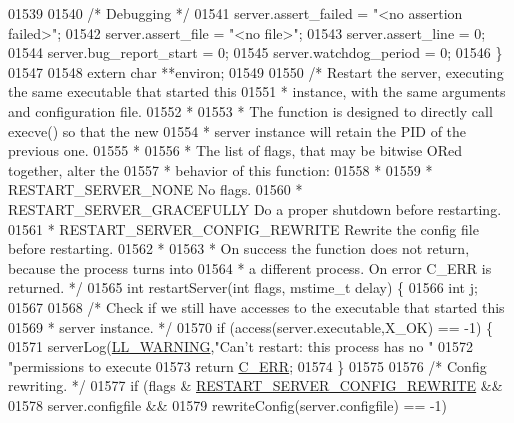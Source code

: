 \begin{DoxyCode}
{{{{{{{{{{{{{{{01539 
01540     \textcolor{comment}{/* Debugging */}
01541     server.assert\_failed = \textcolor{stringliteral}{"<no assertion failed>"};
01542     server.assert\_file = \textcolor{stringliteral}{"<no file>"};
01543     server.assert\_line = 0;
01544     server.bug\_report\_start = 0;
01545     server.watchdog\_period = 0;
01546 \}
01547 
01548 \textcolor{keyword}{extern} \textcolor{keywordtype}{char} **environ;
01549 
01550 \textcolor{comment}{/* Restart the server, executing the same executable that started this}
01551 \textcolor{comment}{ * instance, with the same arguments and configuration file.}
01552 \textcolor{comment}{ *}
01553 \textcolor{comment}{ * The function is designed to directly call execve() so that the new}
01554 \textcolor{comment}{ * server instance will retain the PID of the previous one.}
01555 \textcolor{comment}{ *}
01556 \textcolor{comment}{ * The list of flags, that may be bitwise ORed together, alter the}
01557 \textcolor{comment}{ * behavior of this function:}
01558 \textcolor{comment}{ *}
01559 \textcolor{comment}{ * RESTART\_SERVER\_NONE              No flags.}
01560 \textcolor{comment}{ * RESTART\_SERVER\_GRACEFULLY        Do a proper shutdown before restarting.}
01561 \textcolor{comment}{ * RESTART\_SERVER\_CONFIG\_REWRITE    Rewrite the config file before restarting.}
01562 \textcolor{comment}{ *}
01563 \textcolor{comment}{ * On success the function does not return, because the process turns into}
01564 \textcolor{comment}{ * a different process. On error C\_ERR is returned. */}
01565 \textcolor{keywordtype}{int} restartServer(\textcolor{keywordtype}{int} flags, mstime\_t delay) \{
01566     \textcolor{keywordtype}{int} j;
01567 
01568     \textcolor{comment}{/* Check if we still have accesses to the executable that started this}
01569 \textcolor{comment}{     * server instance. */}
01570     \textcolor{keywordflow}{if} (access(server.executable,X\_OK) == -1) \{
01571         serverLog(\hyperlink{server_8h_a31229b9334bba7d6be2a72970967a14b}{LL\_WARNING},\textcolor{stringliteral}{"Can't restart: this process has no "}
01572                              \textcolor{stringliteral}{"permissions to execute %
01573         \textcolor{keywordflow}{return} \hyperlink{server_8h_af98ac28d5f4d23d7ed5985188e6fb7d1}{C\_ERR};
01574     \}
01575 
01576     \textcolor{comment}{/* Config rewriting. */}
01577     \textcolor{keywordflow}{if} (flags & \hyperlink{server_8h_a57b24bdd0dc4a156941789096e9e1f44}{RESTART\_SERVER\_CONFIG\_REWRITE} &&
01578         server.configfile &&
01579         rewriteConfig(server.configfile) == -1)
}}}}}}}}}}}}}}}}
\end{DoxyCode}
